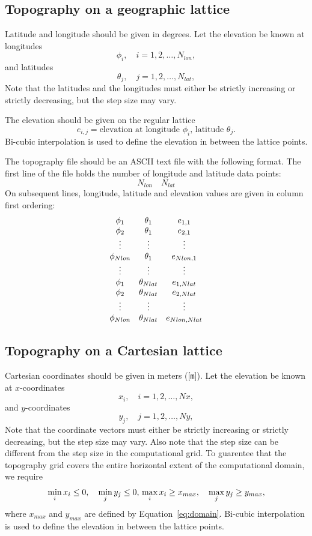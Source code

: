\documentclass[11pt]{report}
\begin{document}
\subsection{Topography on a geographic lattice}
Latitude and longitude should be given in degrees. Let the elevation be known at longitudes
\[
\phi_i,\quad i=1,2,\ldots,N_{lon},
\]
and latitudes
\[
\theta_j,\quad j=1,2,\ldots,N_{lat},
\]
Note that the latitudes and the longitudes must either be strictly increasing or strictly
decreasing, but the step size may vary.

The elevation should be given on the regular lattice
\[
e_{i,j} = \mbox{elevation at longitude $\phi_i$, latitude $\theta_j$.}
\]
Bi-cubic interpolation is used to define the elevation in between the lattice points.

The topography file should be an ASCII text file with the following format. The first line of the
file holds the number of longitude and latitude data points:
\[
N_{lon}\quad N_{lat}
\]
On subsequent lines, longitude, latitude and elevation values are given in column first ordering:
\[
\begin{array}{c c c}
\phi_1 & \theta_1& e_{1,1}\\
\phi_2& \theta_1& e_{2,1}\\
\vdots&\vdots&\vdots\\
\phi_{Nlon}& \theta_1& e_{Nlon,1}\\
\vdots&\vdots&\vdots\\
\phi_1 & \theta_{Nlat}& e_{1,Nlat}\\
\phi_2& \theta_{Nlat}& e_{2,Nlat}\\
\vdots&\vdots&\vdots\\
\phi_{Nlon}& \theta_{Nlat}& e_{Nlon,Nlat}
\end{array}
\]

\subsection{Topography on a Cartesian lattice}
Cartesian coordinates should be given in meters ([{\tt m}]). Let the elevation be known at $x$-coordinates
\[
x_i,\quad i=1,2,\ldots,Nx,
\]
and $y$-coordinates
\[
y_j,\quad j=1,2,\ldots,Ny,
\]
Note that the coordinate vectors must either be strictly increasing or strictly
decreasing, but the step size may vary. Also note that the step size can be different from the step
size in the computational grid. To guarentee that the topography grid covers the entire horizontal
extent of the computational domain, we require
\[
\min_i x_i \leq 0,\quad \min_j y_j \leq 0,\\
\max_i x_i \geq x_{max},\quad \max_j y_j \geq y_{max},
\] 
where $x_{max}$ and $y_{max}$ are defined by Equation~\eqref{eq:domain}. Bi-cubic interpolation is
used to define the elevation in between the lattice points.
\end{document}
